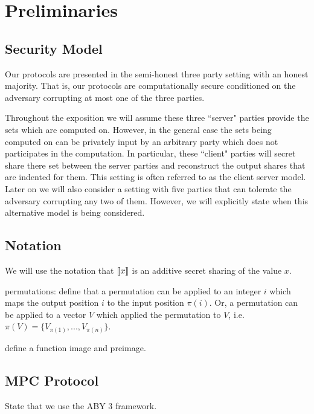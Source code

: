 \section{Preliminaries} \label{sec:prelim}


\subsection{Security Model}

Our protocols are presented in the semi-honest three party setting with an honest majority. That is, our protocols are computationally secure conditioned on the adversary corrupting at most one of the three parties. 



Throughout the exposition we will assume these three ``server" parties provide the sets which are computed on. However, in the general case the sets being computed on can be privately input by an arbitrary party which does not participates in the computation. In particular, these ``client" parties will secret share there set between the server parties and reconstruct the output shares that are indented for them. This setting is often referred to as the client server model\cite{aby3, secureML}. Later on we will also consider a setting with five parties that can tolerate the adversary corrupting any two of them. However, we will explicitly state when this alternative model is being considered.



\subsection{Notation}

We will use the notation that $\llbracket x\rrbracket$ is an additive secret sharing of the value $x$.

permutations: define that a permutation can be applied to an integer $i$ which maps the output position $i$ to the input position $\pi(i)$. Or, a permutation can be applied to a vector $V$ which applied the permutation to $V$, i.e. $\pi(V)=\{V_{\pi(1)}, ..., V_{\pi(n)}\}$. 


define a function image and preimage.


\subsection{MPC Protocol}

State that we use the ABY 3 framework. 

